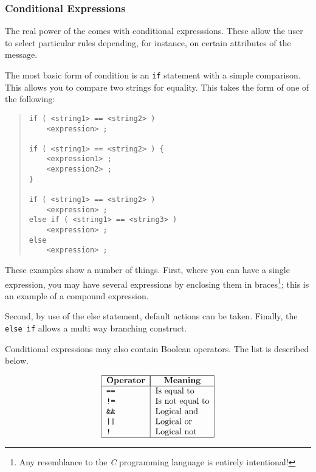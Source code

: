 \subsubsection{Conditional Expressions}

The real power of the  comes with conditional
expresssions. These allow the user to select particular rules
depending, for instance, on certain attributes of the message.

The most basic form of condition is an \verb+if+
statement with a simple comparison. This allows you to compare two
strings for equality. This takes the form of one of the following:

\begin{quote}\small\begin{verbatim}
if ( <string1> == <string2> )
    <expression> ;

if ( <string1> == <string2> ) {
    <expression1> ;
    <expression2> ;
}

if ( <string1> == <string2> )
    <expression> ;
else if ( <string1> == <string3> )
    <expression> ;
else
    <expression> ;
\end{verbatim}\end{quote}

These examples show a number of things. First, where you can have a
single expression, you may have several expressions by enclosing them
in braces\footnote{Any resemblance to the {\em C} programming
language is entirely intentional!}; this is an example of a compound
expression.

Second, by use of the else statement, default actions can be taken.
Finally, the \verb+else if+ allows a multi way
branching construct.

Conditional expressions may also contain Boolean operators. The list
is described below.

\[\begin{tabular}{|l | l|}
\hline
	\multicolumn{1}{|c|}{\bf Operator} &
		\multicolumn{1}{|c|}{\bf Meaning} \\
\hline
	\tt == &	Is equal to\\
	\tt != &	Is not equal to\\
	\tt \&\& &	Logical and \\
	\tt || &	Logical or\\
	\tt ! &		Logical not \\
\hline
\end{tabular}\]


